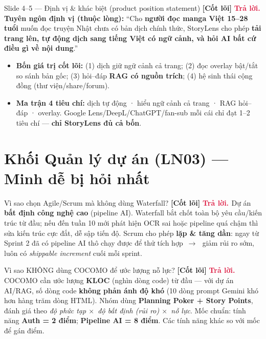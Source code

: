 \documentclass[11pt]{article}
\newcommand{\arr}{\,\ensuremath{\rightarrow}\,}
\newcommand{\x}{\ensuremath{\times}}
\newcommand{\tagCore}{\textcolor{steel}{\footnotesize\textbf{[Cốt lõi]}}}
\newcommand{\A}{\textbf{\textcolor{crimson}{Trả lời. }}}
\begin{document}
\begin{qa}{Slide 4--5 --- Định vị \& khác biệt (product position statement) \tagCore}
\A \textbf{Tuyên ngôn định vị (thuộc lòng):} ``Cho \textbf{người đọc manga Việt 15--28 tuổi} muốn đọc truyện Nhật chưa có bản dịch chính thức, StoryLens cho phép \textbf{tải trang lên, tự động dịch sang tiếng Việt có ngữ cảnh, và hỏi AI bất cứ điều gì về nội dung}.''
\begin{itemize}
  \item \textbf{Bốn giá trị cốt lõi:} (1) dịch giữ ngữ cảnh cả trang; (2) đọc overlay bật/tắt so sánh bản gốc; (3) hỏi--đáp \textbf{RAG có nguồn trích}; (4) hệ sinh thái cộng đồng (thư viện/share/forum).
  \item \textbf{Ma trận 4 tiêu chí:} dịch tự động · hiểu ngữ cảnh cả trang · RAG hỏi--đáp · overlay. Google Lens/DeepL/ChatGPT/fan-sub mỗi cái chỉ đạt 1--2 tiêu chí --- \textbf{chỉ StoryLens đủ cả bốn}.
\end{itemize}
\end{qa}

\section{Khối Quản lý dự án (LN03) --- Minh dễ bị hỏi nhất}

\begin{qa}{Vì sao chọn Agile/Scrum mà không dùng Waterfall? \tagCore}
\A Dự án \textbf{bất định công nghệ cao} (pipeline AI). Waterfall bắt chốt toàn bộ yêu cầu/kiến trúc từ đầu; nếu đến tuần 10 mới phát hiện OCR sai hoặc pipeline quá chậm thì sửa kiến trúc cực đắt, dễ sập tiến độ. Scrum cho phép \textbf{lặp \& tăng dần}: ngay từ Sprint 2 đã có pipeline AI thô chạy được để thử tích hợp \arr\ giảm rủi ro sớm, luôn có \textit{shippable increment} cuối mỗi sprint.
\end{qa}

\begin{qa}{Vì sao KHÔNG dùng COCOMO để ước lượng nỗ lực? \tagCore}
\A COCOMO cần ước lượng \textbf{KLOC} (nghìn dòng code) từ đầu --- với dự án AI/RAG, số dòng code \textbf{không phản ánh độ khó} (10 dòng prompt Gemini khó hơn hàng trăm dòng HTML). Nhóm dùng \textbf{Planning Poker + Story Points}, đánh giá theo \textit{độ phức tạp \x\ độ bất định (rủi ro) \x\ nỗ lực}. Mốc chuẩn: tính năng \textbf{Auth = 2 điểm}; \textbf{Pipeline AI = 8 điểm}. Các tính năng khác so với mốc để gán điểm.
\end{qa}
\end{document}
